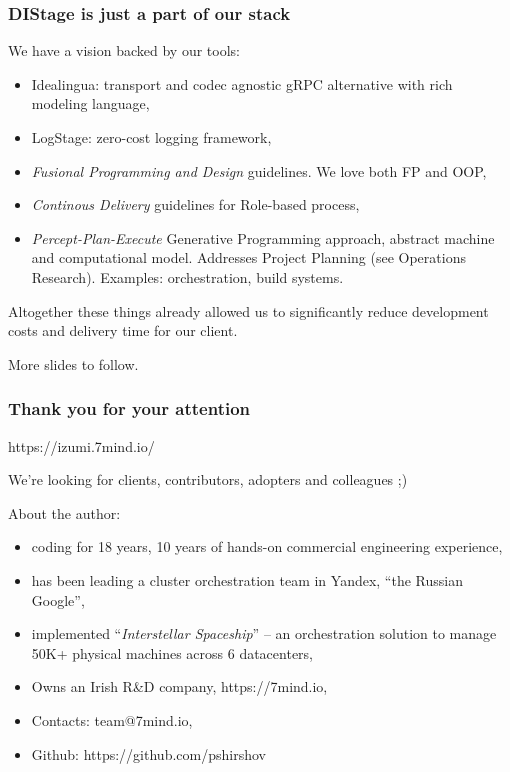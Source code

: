 \documentclass[usenames,dvipsnames]{beamer}
\begin{document}
\begin{frame}
\frametitle{DIStage is just a part of our stack}
We have a vision backed by our tools:
\begin{itemize}
\item Idealingua: transport and codec agnostic gRPC alternative with rich modeling language,
\item LogStage: zero-cost logging framework,
\item \textit{Fusional Programming and Design} guidelines. We love both FP and OOP,
\item \textit{Continous Delivery} guidelines for Role-based process, 
\item \textit{Percept-Plan-Execute} Generative Programming approach, abstract machine and computational model.
Addresses Project Planning (see Operations Research). Examples: orchestration, build systems.
\end{itemize}

Altogether these things already allowed us to significantly reduce development costs and
delivery time for our client.\newline

More slides to follow.
\end{frame}

\begin{frame}
    \frametitle{Thank you for your attention}

    \begin{center}
      https://izumi.7mind.io/

      We're looking for clients, contributors, adopters and colleagues ;)
    \end{center}

    About the author:
    \begin{itemize}
        \item coding for 18 years, 10 years of hands-on commercial engineering experience,
        \item has been leading a cluster orchestration team in Yandex, ``the Russian Google'',
        \item implemented ``\textit{Interstellar Spaceship}'' -- an orchestration solution to manage 50K+ physical machines across 6 datacenters,
        \item Owns an Irish R\&D company, https://7mind.io,
        \item Contacts: team@7mind.io,
        \item Github: https://github.com/pshirshov
    \end{itemize}
\end{frame}
\end{document}
